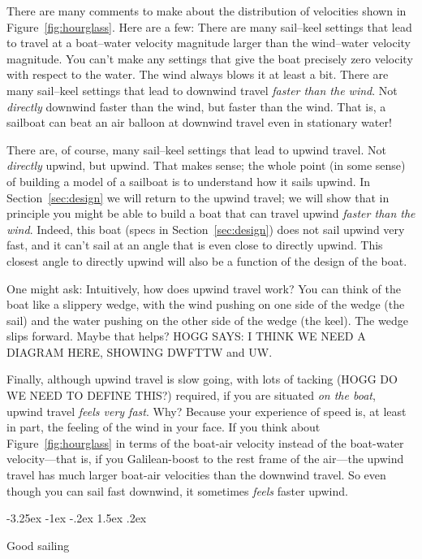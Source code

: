 \documentclass[letterpaper]{article}
\makeatletter
\newcommand{\secref}[1]{Section~\ref{#1}}
\newcommand{\figref}[1]{Figure~\ref{#1}}
\renewcommand\section{\@startsection {section}{1}{\z@}%
  {-3.25ex \@plus -1ex \@minus -.2ex}%
  {1.5ex \@plus .2ex}%
  {\raggedright\normalfont\large\bfseries}}
\makeatother
\begin{document}
There are many comments to make about the distribution of velocities shown in \figref{fig:hourglass}.
Here are a few:
There are many sail--keel settings that lead to travel at a boat--water velocity magnitude larger than the wind--water velocity magnitude.
You can't make any settings that give the boat precisely zero velocity with respect to the water.
The wind always blows it at least a bit.
There are many sail--keel settings that lead to downwind travel \emph{faster than the wind}.
Not \emph{directly} downwind faster than the wind, but faster than the wind.
That is, a sailboat can beat an air balloon at downwind travel even in stationary water!

There are, of course, many sail--keel settings that lead to upwind travel.
Not \emph{directly} upwind, but upwind.
That makes sense; the whole point (in some sense) of building a model of a sailboat is to understand how it sails upwind.
In \secref{sec:design} we will return to the upwind travel; we will show that in principle you might be able to build a boat that can travel upwind \emph{faster than the wind}.
Indeed, this boat (specs in \secref{sec:design}) does not sail upwind very fast, and it can't sail at an angle that is even close to directly upwind.
This closest angle to directly upwind will also be a function of the design of the boat.

One might ask: Intuitively, how does upwind travel work?
You can think of the boat like a slippery wedge, with the wind pushing on one side of the wedge (the sail) and the water pushing on the other side of the wedge (the keel).
The wedge slips forward.
Maybe that helps?
HOGG SAYS: I THINK WE NEED A DIAGRAM HERE, SHOWING DWFTTW and UW.

Finally, although upwind travel is slow going, with lots of tacking (HOGG DO WE NEED TO DEFINE THIS?) required, if you are situated \emph{on the boat}, upwind travel \emph{feels very fast}.
Why?
Because your experience of speed is, at least in part, the feeling of the wind in your face.
If you think about \figref{fig:hourglass} in terms of the boat-air velocity instead of the boat-water velocity---that is, if you Galilean-boost to the rest frame of the air---the upwind travel has much larger boat-air velocities than the downwind travel.
So even though you can sail fast downwind, it sometimes \emph{feels} faster upwind.

\section{Good sailing}\label{sec:good}
\end{document}

